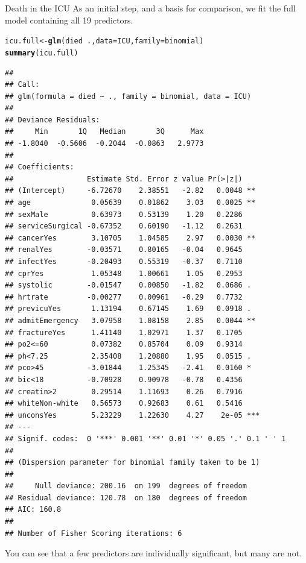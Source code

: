 \documentclass[11pt]{book}\usepackage[]{graphicx}\usepackage[]{color}
\makeatletter
\newcommand{\hlopt}[1]{\textcolor[rgb]{0,0,0}{#1}}%
\newcommand{\hlstd}[1]{\textcolor[rgb]{0.345,0.345,0.345}{#1}}%
\newcommand{\hlkwb}[1]{\textcolor[rgb]{0.69,0.353,0.396}{#1}}%
\newcommand{\hlkwc}[1]{\textcolor[rgb]{0.333,0.667,0.333}{#1}}%
\newcommand{\hlkwd}[1]{\textcolor[rgb]{0.737,0.353,0.396}{\textbf{#1}}}%
\newenvironment{kframe}{%
 \def\at@end@of@kframe{}%
 \ifinner\ifhmode%
  \def\at@end@of@kframe{\end{minipage}}%
  \begin{minipage}{\columnwidth}%
 \fi\fi%
 \def\FrameCommand##1{\hskip\@totalleftmargin \hskip-\fboxsep
 \colorbox{shadecolor}{##1}\hskip-\fboxsep
     \hskip-\linewidth \hskip-\@totalleftmargin \hskip\columnwidth}%
 \MakeFramed {\advance\hsize-\width
   \@totalleftmargin\z@ \linewidth\hsize
   \@setminipage}}%
 {\par\unskip\endMakeFramed%
 \at@end@of@kframe}
\newenvironment{knitrout}{}{} %
\renewenvironment{knitrout}{\small\renewcommand{\baselinestretch}{.85}}{} %
\makeatother
\begin{document}
\begin{Example}[icu1]{Death in the ICU}
As an initial step, and a basis for comparison, we fit the full model
containing all 19 predictors.  
\begin{knitrout}
\color{fgcolor}\begin{kframe}
\begin{alltt}
\hlstd{icu.full} \hlkwb{<-} \hlkwd{glm}\hlstd{(died} \hlopt{~} \hlstd{.,} \hlkwc{data}\hlstd{=ICU,} \hlkwc{family}\hlstd{=binomial)}
\hlkwd{summary}\hlstd{(icu.full)}
\end{alltt}
\begin{verbatim}
## 
## Call:
## glm(formula = died ~ ., family = binomial, data = ICU)
## 
## Deviance Residuals: 
##     Min       1Q   Median       3Q      Max  
## -1.8040  -0.5606  -0.2044  -0.0863   2.9773  
## 
## Coefficients:
##                 Estimate Std. Error z value Pr(>|z|)    
## (Intercept)     -6.72670    2.38551   -2.82   0.0048 ** 
## age              0.05639    0.01862    3.03   0.0025 ** 
## sexMale          0.63973    0.53139    1.20   0.2286    
## serviceSurgical -0.67352    0.60190   -1.12   0.2631    
## cancerYes        3.10705    1.04585    2.97   0.0030 ** 
## renalYes        -0.03571    0.80165   -0.04   0.9645    
## infectYes       -0.20493    0.55319   -0.37   0.7110    
## cprYes           1.05348    1.00661    1.05   0.2953    
## systolic        -0.01547    0.00850   -1.82   0.0686 .  
## hrtrate         -0.00277    0.00961   -0.29   0.7732    
## previcuYes       1.13194    0.67145    1.69   0.0918 .  
## admitEmergency   3.07958    1.08158    2.85   0.0044 ** 
## fractureYes      1.41140    1.02971    1.37   0.1705    
## po2<=60          0.07382    0.85704    0.09   0.9314    
## ph<7.25          2.35408    1.20880    1.95   0.0515 .  
## pco>45          -3.01844    1.25345   -2.41   0.0160 *  
## bic<18          -0.70928    0.90978   -0.78   0.4356    
## creatin>2        0.29514    1.11693    0.26   0.7916    
## whiteNon-white   0.56573    0.92683    0.61   0.5416    
## unconsYes        5.23229    1.22630    4.27    2e-05 ***
## ---
## Signif. codes:  0 '***' 0.001 '**' 0.01 '*' 0.05 '.' 0.1 ' ' 1
## 
## (Dispersion parameter for binomial family taken to be 1)
## 
##     Null deviance: 200.16  on 199  degrees of freedom
## Residual deviance: 120.78  on 180  degrees of freedom
## AIC: 160.8
## 
## Number of Fisher Scoring iterations: 6
\end{verbatim}
\end{kframe}
\end{knitrout}
\noindent You can see that a few predictors are individually significant, but many are not.


\end{Example}
\end{document}
